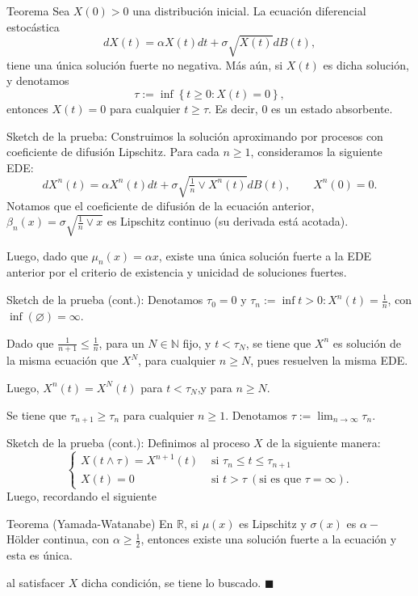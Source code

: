 \documentclass{beamer}
\newcommand{\N}{\mathbb N}
\newcommand{\R}{\mathbb{R}}
\renewcommand{\to}{\rightarrow}
\renewcommand{\1}{\mathds{1}}
\theoremstyle{definition}
\theoremstyle{definition}
\theoremstyle{definition}
\theoremstyle{definition}
\theoremstyle{definition}
\begin{document}
\begin{frame}
    \begin{block}{Teorema}
        Sea $X(0)>0$ una distribución inicial. La ecuación diferencial estocástica 
        \[
            dX(t)=\alpha X(t)dt+\sigma\sqrt{X(t)}dB(t),
        \]
        tiene una única solución fuerte no negativa. Más aún, si $X(t)$ es dicha solución, 
        y denotamos 
        \[
        \tau:=\inf \left\{t\geq0 : X(t)=0\right\},
        \]
        entonces $X(t)=0$ para cualquier $t\geq\tau$. Es decir, 0 es un estado absorbente.
    \end{block}
\end{frame}
\begin{frame}{Sketch de la prueba:}
    Construimos la solución aproximando por procesos con coeficiente de difusión Lipschitz. Para cada $n\geq1$,
    consideramos la siguiente EDE:
    \[
    dX^{n}(t)=\alpha X^{n}(t)dt+\sigma \sqrt{\tfrac{1}{n}\vee X^{n}(t)}dB(t), \qquad X^{n}(0)=0.    
    \] 
    Notamos que el coeficiente de difusión de la ecuación anterior, $\beta_n(x)=\sigma\sqrt{\tfrac{1}{n}\vee x}$
    es Lipschitz continuo (su derivada está acotada).
    \newline
    
    Luego, dado que $\mu_n(x)=\alpha x$, existe una única solución fuerte a la EDE anterior por el criterio 
    de existencia y unicidad de soluciones fuertes.
\end{frame}
\begin{frame}{Sketch de la prueba (cont.):}
    Denotamos $\tau_0=0$ y $\tau_n:=\inf{t>0:X^{n}(t)=\tfrac{1}{n}}$, con $\inf(\varnothing)=\infty$.
    \newline

    Dado que $\tfrac{1}{n+1}\leq \tfrac{1}{n}$, para un $N\in \N$ fijo, y $t<\tau_N$, se tiene que 
    $X^{n}$ es solución de la misma ecuación que $X^{N}$, para cualquier $n\geq N$, pues resuelven la misma EDE.
    \newline
    
    Luego, $X^{n}(t)=X^{N}(t)$ para $t<\tau_N$,y para $n\geq N$.
    \newline

    Se tiene que $\tau_{n+1}\geq \tau_n$ para cualquier $n\geq1$. Denotamos $\tau:=\lim_{n\to\infty}\tau_n$.
\end{frame}
\begin{frame}{Sketch de la prueba (cont.):}
    Definimos al proceso $X$ de la siguiente manera: 
    \[
    \begin{cases}
        X(t\wedge \tau)=X^{n+1}(t) & \text{ si } \tau_n\leq t \leq \tau_{n+1}\\
        X(t)=0 & \text{ si } t>\tau \ (\text{si es que $\tau=\infty$}).
    \end{cases}    
    \]
    Luego, recordando el siguiente
    \begin{block}{Teorema (Yamada-Watanabe)}
        En $\R$, si $\mu(x)$ es Lipschitz y $\sigma(x)$ es $\alpha-$Hölder continua, con $\alpha\geq \tfrac{1}{2}$, entonces 
        existe una solución fuerte a la ecuación y esta es única.
    \end{block}
    al satisfacer $X$ dicha condición, se tiene lo buscado. $\blacksquare$
\end{frame}
\end{document}
